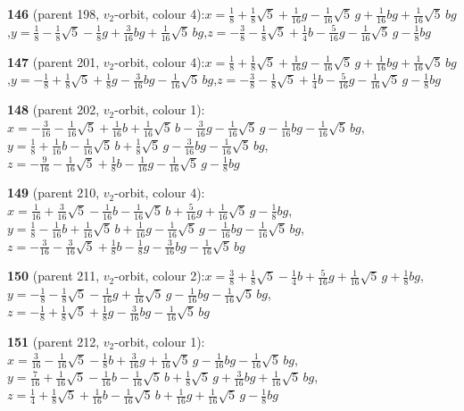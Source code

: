 \documentclass[10pt]{article}
\begin{document}
{\noindent\textbf{146} (parent 198, $v_2$-orbit, colour 4):\quad $x=\tfrac{1}{8}+\tfrac{1}{8}\sqrt5+\tfrac{1}{16}g-\tfrac{1}{16}\sqrt5\,g+\tfrac{1}{16}bg+\tfrac{1}{16}\sqrt5\,bg$,\quad $y=\tfrac{1}{8}-\tfrac{1}{8}\sqrt5-\tfrac{1}{8}g+\tfrac{3}{16}bg+\tfrac{1}{16}\sqrt5\,bg$,\quad $z=-\tfrac{3}{8}-\tfrac{1}{8}\sqrt5+\tfrac{1}{4}b-\tfrac{5}{16}g-\tfrac{1}{16}\sqrt5\,g-\tfrac{1}{8}bg$\par\smallskip
\noindent\textbf{147} (parent 201, $v_2$-orbit, colour 4):\quad $x=\tfrac{1}{8}+\tfrac{1}{8}\sqrt5+\tfrac{1}{16}g-\tfrac{1}{16}\sqrt5\,g+\tfrac{1}{16}bg+\tfrac{1}{16}\sqrt5\,bg$,\quad $y=-\tfrac{1}{8}+\tfrac{1}{8}\sqrt5+\tfrac{1}{8}g-\tfrac{3}{16}bg-\tfrac{1}{16}\sqrt5\,bg$,\quad $z=-\tfrac{3}{8}-\tfrac{1}{8}\sqrt5+\tfrac{1}{4}b-\tfrac{5}{16}g-\tfrac{1}{16}\sqrt5\,g-\tfrac{1}{8}bg$\par\smallskip
\noindent\textbf{148} (parent 202, $v_2$-orbit, colour 1):\quad $x=-\tfrac{3}{16}-\tfrac{1}{16}\sqrt5+\tfrac{1}{16}b+\tfrac{1}{16}\sqrt5\,b-\tfrac{3}{16}g-\tfrac{1}{16}\sqrt5\,g-\tfrac{1}{16}bg-\tfrac{1}{16}\sqrt5\,bg$,\quad $y=\tfrac{1}{8}+\tfrac{1}{16}b-\tfrac{1}{16}\sqrt5\,b+\tfrac{1}{8}\sqrt5\,g-\tfrac{3}{16}bg-\tfrac{1}{16}\sqrt5\,bg$,\quad $z=-\tfrac{9}{16}-\tfrac{1}{16}\sqrt5+\tfrac{1}{8}b-\tfrac{1}{16}g-\tfrac{1}{16}\sqrt5\,g-\tfrac{1}{8}bg$\par\smallskip
\noindent\textbf{149} (parent 210, $v_2$-orbit, colour 4):\quad $x=\tfrac{1}{16}+\tfrac{3}{16}\sqrt5-\tfrac{1}{16}b-\tfrac{1}{16}\sqrt5\,b+\tfrac{5}{16}g+\tfrac{1}{16}\sqrt5\,g-\tfrac{1}{8}bg$,\quad $y=\tfrac{1}{8}-\tfrac{1}{16}b+\tfrac{1}{16}\sqrt5\,b+\tfrac{1}{16}g-\tfrac{1}{16}\sqrt5\,g-\tfrac{1}{16}bg-\tfrac{1}{16}\sqrt5\,bg$,\quad $z=-\tfrac{3}{16}-\tfrac{3}{16}\sqrt5+\tfrac{1}{8}b-\tfrac{1}{8}g-\tfrac{3}{16}bg-\tfrac{1}{16}\sqrt5\,bg$\par\smallskip
\noindent\textbf{150} (parent 211, $v_2$-orbit, colour 2):\quad $x=\tfrac{3}{8}+\tfrac{1}{8}\sqrt5-\tfrac{1}{4}b+\tfrac{5}{16}g+\tfrac{1}{16}\sqrt5\,g+\tfrac{1}{8}bg$,\quad $y=-\tfrac{1}{8}-\tfrac{1}{8}\sqrt5-\tfrac{1}{16}g+\tfrac{1}{16}\sqrt5\,g-\tfrac{1}{16}bg-\tfrac{1}{16}\sqrt5\,bg$,\quad $z=-\tfrac{1}{8}+\tfrac{1}{8}\sqrt5+\tfrac{1}{8}g-\tfrac{3}{16}bg-\tfrac{1}{16}\sqrt5\,bg$\par\smallskip
\noindent\textbf{151} (parent 212, $v_2$-orbit, colour 1):\quad $x=\tfrac{3}{16}-\tfrac{1}{16}\sqrt5-\tfrac{1}{8}b+\tfrac{3}{16}g+\tfrac{1}{16}\sqrt5\,g-\tfrac{1}{16}bg-\tfrac{1}{16}\sqrt5\,bg$,\quad $y=\tfrac{7}{16}+\tfrac{1}{16}\sqrt5-\tfrac{1}{16}b-\tfrac{1}{16}\sqrt5\,b+\tfrac{1}{8}\sqrt5\,g+\tfrac{3}{16}bg+\tfrac{1}{16}\sqrt5\,bg$,\quad $z=\tfrac{1}{4}+\tfrac{1}{8}\sqrt5+\tfrac{1}{16}b-\tfrac{1}{16}\sqrt5\,b+\tfrac{1}{16}g+\tfrac{1}{16}\sqrt5\,g-\tfrac{1}{8}bg$\par\smallskip
}
\end{document}
